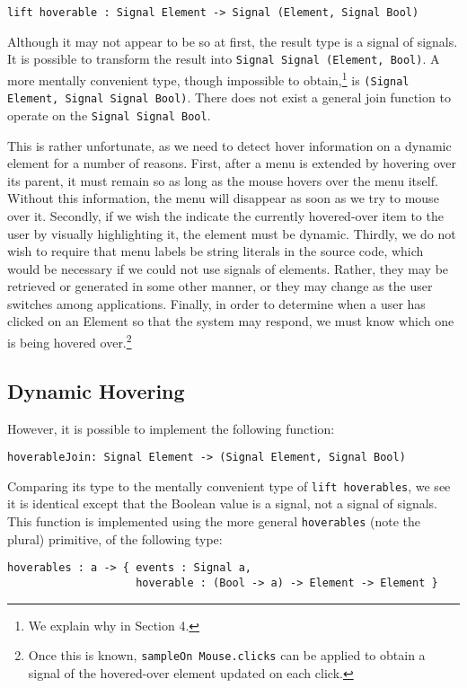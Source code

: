 \documentclass{article}
\begin{document}
\texttt{lift hoverable : Signal Element -\textgreater{} Signal (Element, Signal Bool)}

Although it may not appear to be so at first, the result type is a signal of
signals. It is possible to transform the result into \texttt{Signal Signal
(Element, Bool)}. A more mentally convenient type, though impossible to
obtain,\footnote{We explain why in Section 4.}
is \texttt{(Signal Element, Signal Signal Bool)}. There does not exist a general
join function to operate on the \texttt{Signal Signal Bool}.

This is rather unfortunate, as we need to detect hover information on a dynamic
element for a number of reasons. First, after a menu is extended by hovering
over its parent, it must remain so as long as the mouse hovers over the menu
itself. Without this information, the menu will disappear as soon as we try to
mouse over it. Secondly, if we wish the indicate the currently hovered-over item
to the user by visually highlighting it, the element must be dynamic. Thirdly,
we do not wish to require that menu labels be string literals in the source
code, which would be necessary if we could not use signals of elements. Rather,
they may be retrieved or generated in some other manner, or they may change as
the user switches among applications. Finally, in order to determine when a user
has clicked on an Element so that the system may respond, we must know which one
is being hovered over.\footnote{Once this is known, \texttt{sampleOn
Mouse.clicks} can be applied to obtain a signal of the hovered-over element
updated on each click.}

\subsection{Dynamic Hovering}
However, it is possible to implement the following function:

\texttt{hoverableJoin: Signal Element -\textgreater{} (Signal Element, Signal Bool)}

Comparing its type to the mentally convenient type of \texttt{lift hoverables},
we see it is identical except that the Boolean value is a signal, not a signal
of signals. This function is implemented using the more general
\texttt{hoverables} (note the plural) primitive, of the following type:

\begin{verbatim}
hoverables : a -> { events : Signal a,
                    hoverable : (Bool -> a) -> Element -> Element }
\end{verbatim}
\end{document}
